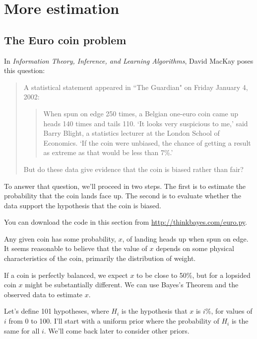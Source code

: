 \documentclass[12pt]{book}
\begin{document}
\chapter{More estimation}

\section{The Euro coin problem}
\label{euro}

In {\it Information Theory, Inference, and Learning Algorithms}, David MacKay
poses this question:

\begin{quote}
A statistical statement appeared in ``The Guardian" on Friday January 4, 2002:

  \begin{quote}
        When spun on edge 250 times, a Belgian one-euro coin came
        up heads 140 times and tails 110.  `It looks very suspicious
        to me,' said Barry Blight, a statistics lecturer at the London
        School of Economics.  `If the coin were unbiased, the chance of
        getting a result as extreme as that would be less than 7\%.'
        \end{quote}

But do these data give evidence that the coin is biased rather than fair?
\end{quote}

To answer that question, we'll proceed in two steps.  The first
is to estimate the probability that the coin lands face up.  The second
is to evaluate whether the data support the hypothesis that the
coin is biased.

You can download the code in this section from
\url{http://thinkbayes.com/euro.py}.

Any given coin has some probability, $x$, of landing heads up when spun
on edge.  It seems reasonable to believe that the value of $x$ depends
on some physical characteristics of the coin, primarily the distribution
of weight.

If a coin is perfectly balanced, we expect $x$ to be close to 50\%, but
for a lopsided coin $x$ might be substantially different.  We can use
Bayes's Theorem and the observed data to estimate $x$.

Let's define 101 hypotheses, where $H_i$ is the hypothesis that
$x$ is $i$\%, for values of $i$ from 0 to 100.  I'll start with a uniform
prior where the probability of $H_i$ is the same for all $i$.  We'll
come back later to consider other priors.
\end{document}
